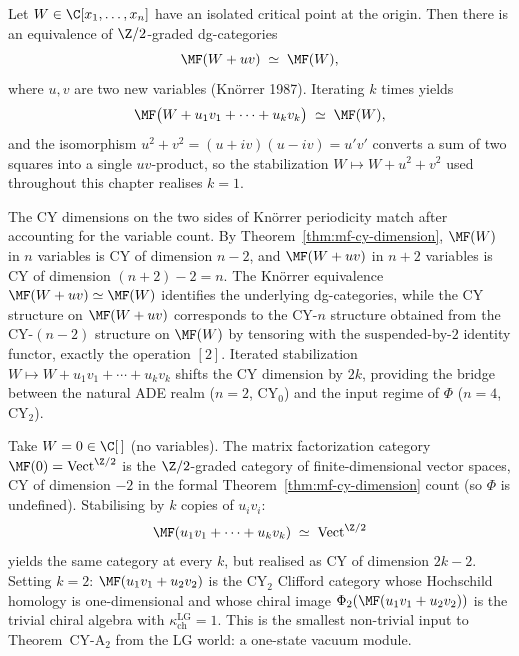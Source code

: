 \begin{theorem}
\label{thm:knorrer-periodicity}
Let $W \in \C[x_1, \ldots, x_n]$ have an isolated critical point at the origin. Then there is an equivalence of $\Z/2$-graded dg-categories
\[
 \MF(W + uv) \;\simeq\; \MF(W),
\]
where $u, v$ are two new variables (Kn\"orrer 1987). Iterating $k$ times yields
\[
 \MF\bigl(W + u_1 v_1 + \cdots + u_k v_k\bigr) \;\simeq\; \MF(W),
\]
and the isomorphism $u^2 + v^2 = (u + iv)(u - iv) = u'v'$ converts a sum of two squares into a single $uv$-product, so the stabilization $W \mapsto W + u^2 + v^2$ used throughout this chapter realises $k = 1$.
\end{theorem}

\begin{remark}
\label{rem:knorrer-cy-consistency}
The CY dimensions on the two sides of Kn\"orrer periodicity match after accounting for the variable count. By Theorem~\ref{thm:mf-cy-dimension}, $\MF(W)$ in $n$ variables is CY of dimension $n - 2$, and $\MF(W + uv)$ in $n + 2$ variables is CY of dimension $(n + 2) - 2 = n$. The Kn\"orrer equivalence $\MF(W + uv) \simeq \MF(W)$ identifies the underlying dg-categories, while the CY structure on $\MF(W + uv)$ corresponds to the CY-$n$ structure obtained from the CY-$(n-2)$ structure on $\MF(W)$ by tensoring with the suspended-by-$2$ identity functor, exactly the operation $[2]$. Iterated stabilization $W \mapsto W + u_1 v_1 + \cdots + u_k v_k$ shifts the CY dimension by $2k$, providing the bridge between the natural ADE realm ($n = 2$, CY$_0$) and the input regime of $\Phi$ ($n = 4$, CY$_2$).
\end{remark}

\begin{example}
\label{ex:stabilization-empty-lg}
Take $W = 0 \in \C[\,]$ (no variables). The matrix factorization category $\MF(0) = \mathrm{Vect}^{\Z/2}$ is the $\Z/2$-graded category of finite-dimensional vector spaces, CY of dimension $-2$ in the formal Theorem~\ref{thm:mf-cy-dimension} count (so $\Phi$ is undefined). Stabilising by $k$ copies of $u_i v_i$:
\[
 \MF(u_1 v_1 + \cdots + u_k v_k) \;\simeq\; \mathrm{Vect}^{\Z/2}
\]
yields the same category at every $k$, but realised as CY of dimension $2k - 2$. Setting $k = 2$: $\MF(u_1 v_1 + u_2 v_2)$ is the CY$_2$ Clifford category whose Hochschild homology is one-dimensional and whose chiral image $\Phi_2(\MF(u_1 v_1 + u_2 v_2))$ is the trivial chiral algebra with $\kappa_{\mathrm{ch}}^{\mathrm{LG}} = 1$. This is the smallest non-trivial input to Theorem~CY-A$_2$ from the LG world: a one-state vacuum module.
\end{example}


